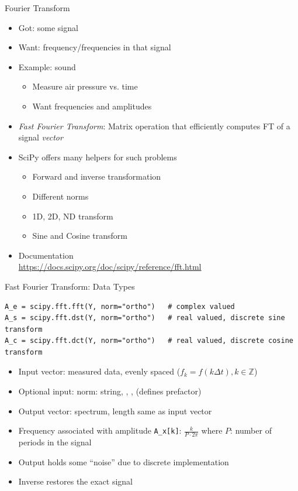 \begin{frame}{Fourier Transform}
%
\begin{itemize}
\item Got: some signal
\item Want: frequency/frequencies in that signal
\item Example: sound
	\begin{itemize}
	\item Measure air pressure vs. time
	\item Want frequencies and amplitudes
	\end{itemize}
\item \emph{Fast Fourier Transform}: Matrix operation that efficiently computes FT of a signal \emph{vector}
\item SciPy offers many helpers for such problems
	\begin{itemize}
	\item Forward and inverse transformation
	\item Different norms
	\item 1D, 2D, ND transform
	\item Sine and Cosine transform
	\end{itemize}
\item Documentation\\
	{\scriptsize \url{https://docs.scipy.org/doc/scipy/reference/fft.html}}
\end{itemize}
%
\end{frame}


\begin{frame}[fragile]{Fast Fourier Transform: Data Types}
%
\begin{codebox}
\begin{verbatim}
A_e = scipy.fft.fft(Y, norm="ortho")   # complex valued
A_s = scipy.fft.dst(Y, norm="ortho")   # real valued, discrete sine transform
A_c = scipy.fft.dct(Y, norm="ortho")   # real valued, discrete cosine transform
\end{verbatim}
\end{codebox}
%
\begin{itemize}
\item Input vector: measured data, evenly spaced ($f_k = f(k \Delta t), k \in \mathbb{Z}$)
\item Optional input: norm: string, , ,  (defines prefactor)
\item Output vector: spectrum, length same as input vector
\item Frequency associated with amplitude \texttt{A\_x[k]}: $\frac{k}{P \cdot 2 \pi}$ where $P$: number of periods in the signal
\item Output holds some \enquote{noise} due to discrete implementation
\item Inverse restores the exact signal
\end{itemize}
%
\end{frame}

